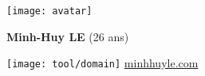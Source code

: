 \begin{minipage}{.20\textwidth}
		\texttt{[image: avatar]}
\end{minipage}
\begin{minipage}{.80\textwidth}
	\begin{minipage}{\textwidth}
		\begin{minipage}[t]{.35\textwidth}
			{
				\textbf{Minh-Huy LE} (26 ans)\\

			}
			\hfill
		\end{minipage}
		\begin{minipage}{.65\textwidth}
			\centering{
				\textbf{

				}
			}
			\hfill
		\end{minipage}
	\end{minipage}
	\begin{minipage}{\textwidth}
	
		\texttt{[image: tool/domain]}
		\href{www.minhhuyle.com}{minhhuyle.com}\hfill
	\end{minipage}
\end{minipage}

